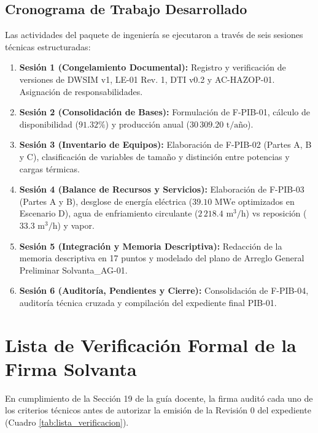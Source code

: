 \documentclass[10pt,letterpaper]{article}
\begin{document}
\subsection{Cronograma de Trabajo Desarrollado}
Las actividades del paquete de ingeniería se ejecutaron a través de seis sesiones técnicas estructuradas:
\begin{enumerate}
    \item \textbf{Sesión 1 (Congelamiento Documental):} Registro y verificación de versiones de DWSIM v1, LE-01 Rev. 1, DTI v0.2 y AC-HAZOP-01. Asignación de responsabilidades.
    \item \textbf{Sesión 2 (Consolidación de Bases):} Formulación de F-PIB-01, cálculo de disponibilidad ($91.32\%$) y producción anual ($30\,309.20\text{ t/año}$).
    \item \textbf{Sesión 3 (Inventario de Equipos):} Elaboración de F-PIB-02 (Partes A, B y C), clasificación de variables de tamaño y distinción entre potencias y cargas térmicas.
    \item \textbf{Sesión 4 (Balance de Recursos y Servicios):} Elaboración de F-PIB-03 (Partes A y B), desglose de energía eléctrica ($39.10\text{ MWe}$ optimizados en Escenario D), agua de enfriamiento circulante ($2\,218.4\text{ m}^3\text{/h}$) vs reposición ($33.3\text{ m}^3\text{/h}$) y vapor.
    \item \textbf{Sesión 5 (Integración y Memoria Descriptiva):} Redacción de la memoria descriptiva en 17 puntos y modelado del plano de Arreglo General Preliminar Solvanta\_AG-01.
    \item \textbf{Sesión 6 (Auditoría, Pendientes y Cierre):} Consolidación de F-PIB-04, auditoría técnica cruzada y compilación del expediente final PIB-01.
\end{enumerate}

\newpage
\section{Lista de Verificación Formal de la Firma Solvanta}

En cumplimiento de la Sección 19 de la guía docente, la firma auditó cada uno de los criterios técnicos antes de autorizar la emisión de la Revisión 0 del expediente (Cuadro \ref{tab:lista_verificacion}).
\end{document}
